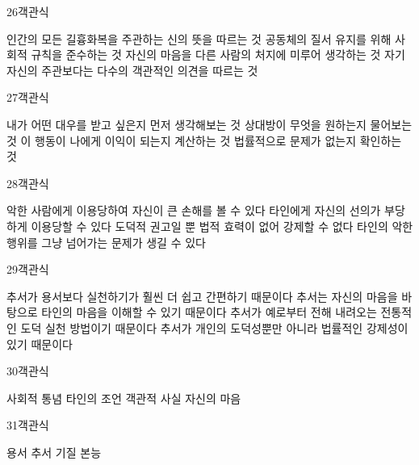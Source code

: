 \documentclass[fs9,seriesRus]{korfarm-base}
\begin{document}
\begin{kfQBlock}{26}{객관식}
\begin{kfChoices}
\kfChoice 인간의 모든 길흉화복을 주관하는 신의 뜻을 따르는 것
\kfChoice 공동체의 질서 유지를 위해 사회적 규칙을 준수하는 것
\kfChoice 자신의 마음을 다른 사람의 처지에 미루어 생각하는 것
\kfChoice 자기 자신의 주관보다는 다수의 객관적인 의견을 따르는 것
\end{kfChoices}
\end{kfQBlock}
\begin{kfQBlock}{27}{객관식}
\begin{kfChoices}
\kfChoice 내가 어떤 대우를 받고 싶은지 먼저 생각해보는 것
\kfChoice 상대방이 무엇을 원하는지 물어보는 것
\kfChoice 이 행동이 나에게 이익이 되는지 계산하는 것
\kfChoice 법률적으로 문제가 없는지 확인하는 것
\end{kfChoices}
\end{kfQBlock}
\begin{kfQBlock}{28}{객관식}
\begin{kfChoices}
\kfChoice 악한 사람에게 이용당하여 자신이 큰 손해를 볼 수 있다
\kfChoice 타인에게 자신의 선의가 부당하게 이용당할 수 있다
\kfChoice 도덕적 권고일 뿐 법적 효력이 없어 강제할 수 없다
\kfChoice 타인의 악한 행위를 그냥 넘어가는 문제가 생길 수 있다
\end{kfChoices}
\end{kfQBlock}
\begin{kfQBlock}{29}{객관식}
\begin{kfChoices}
\kfChoice 추서가 용서보다 실천하기가 훨씬 더 쉽고 간편하기 때문이다
\kfChoice 추서는 자신의 마음을 바탕으로 타인의 마음을 이해할 수 있기 때문이다
\kfChoice 추서가 예로부터 전해 내려오는 전통적인 도덕 실천 방법이기 때문이다
\kfChoice 추서가 개인의 도덕성뿐만 아니라 법률적인 강제성이 있기 때문이다
\end{kfChoices}
\end{kfQBlock}
\begin{kfQBlock}{30}{객관식}
\begin{kfChoices}
\kfChoice 사회적 통념
\kfChoice 타인의 조언
\kfChoice 객관적 사실
\kfChoice 자신의 마음
\end{kfChoices}
\end{kfQBlock}
\begin{kfQBlock}{31}{객관식}
\begin{kfChoices}
\kfChoice 용서
\kfChoice 추서
\kfChoice 기질
\kfChoice 본능
\end{kfChoices}
\end{kfQBlock}
\end{document}
